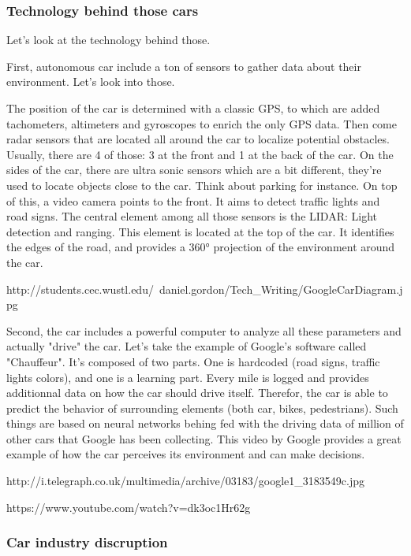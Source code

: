\documentclass[12pt]{article}
\begin{document}
\subsubsection{Technology behind those cars}

Let's look at the technology behind those. 

First, autonomous car include a ton of sensors to gather data about their environment. Let's look into those. 

The position of the car is determined with a classic GPS, to which are added tachometers, altimeters and gyroscopes to enrich the only GPS data. 
Then come radar sensors that are located all around the car to localize potential obstacles. Usually, there are 4 of those: 3 at the front and 1 at the back of the car. On the sides of the car, there are ultra sonic sensors which are a bit different, they're used to locate objects close to the car. Think about parking for instance. 
On top of this, a video camera points to the front. It aims to detect traffic lights and road signs. 
The central element among all those sensors is the LIDAR: Light detection and ranging. This element is located at the top of the car. It identifies the edges of the road, and provides a 360° projection of the environment around the car. 

http://students.cec.wustl.edu/~daniel.gordon/Tech_Writing/GoogleCarDiagram.jpg 

Second, the car includes a powerful computer to analyze all these parameters and actually "drive" the car. Let's take the example of Google's software called "Chauffeur". It's composed of two parts. One is hardcoded (road signs, traffic lights colors), and one is a learning part. Every mile is logged and provides additionnal data on how the car should drive itself. 
Therefor, the car is able to predict the behavior of surrounding elements (both car, bikes, pedestrians). Such things are based on neural networks behing fed with the driving data of million of other cars that Google has been collecting. This video by Google provides a great example of how the car perceives its environment and can make decisions. 

http://i.telegraph.co.uk/multimedia/archive/03183/google1_3183549c.jpg

https://www.youtube.com/watch?v=dk3oc1Hr62g


\subsubsection{Car industry discruption}
\end{document}
